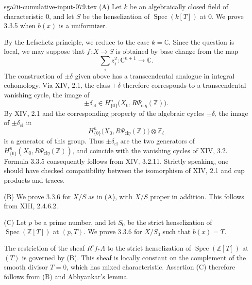 \begin{filecontents*}{sga7ii-cumulative-input-079.tex}
\medskip
\noindent\textup{(A)}
Let $k$ be an algebraically closed field of characteristic $0$, and
let $S$ be the henselization of $\operatorname{Spec}(k[T])$ at $0$.
We prove 3.3.5 when $b(x)$ is a uniformizer.

By the Lefschetz principle, we reduce to the case $k=\mathbb C$.
Since the question is local, we may suppose that $f:X\to S$ is
obtained by base change from the map
\[
\sum_i z_i^2:\mathbb C^{n+1}\longrightarrow\mathbb C.
\]
The construction of $\pm\delta$ given above has a transcendental
analogue in integral cohomology.  Via XIV, 2.1, the class
$\pm\delta$ therefore corresponds to a transcendental vanishing
cycle, the image of
\[
\pm\delta_{\mathrm{cl}}
\in H^n_{\{0\}}\bigl(X_0,R\Psi_{\mathrm{cl}\eta}(\mathbb Z)\bigr).
\]
By XIV, 2.1 and the corresponding property of the algebraic cycles
$\pm\delta$, the image of $\pm\delta_{\mathrm{cl}}$ in
\[
H^n_{\{0\}}\bigl(X_0,R\Psi_{\mathrm{cl}\eta}(\mathbb Z)\bigr)
\otimes\mathbb Z_\ell
\]
is a generator of this group.  Thus $\pm\delta_{\mathrm{cl}}$ are the
two generators of
$H^n_{\{0\}}(X_0,R\Psi_{\mathrm{cl}\eta}(\mathbb Z))$, and coincide
with the vanishing cycles of XIV, 3.2.  Formula 3.3.5 consequently
follows from XIV, 3.2.11.  Strictly speaking, one should have checked
compatibility between the isomorphism of XIV, 2.1 and cup products
and traces.

\medskip
\noindent\textup{(B)}
We prove 3.3.6 for $X/S$ as in (A), with $X/S$ proper in addition.
This follows from XIII, 2.4.6.2.

\medskip
\noindent\textup{(C)}
Let $p$ be a prime number, and let $S_0$ be the strict henselization
of $\operatorname{Spec}(\mathbb Z[T])$ at $(p,T)$.  We prove 3.3.6
for $X/S_0$ such that $b(x)=T$.

The restriction of the sheaf $R^if_*\Lambda$ to the strict
henselization of $\operatorname{Spec}(\mathbb Z[T])$ at $(T)$ is
governed by (B).  This sheaf is
locally constant on the complement of the smooth divisor $T=0$,
which has mixed characteristic.  Assertion (C) therefore follows
from (B) and Abhyankar's lemma.
\end{filecontents*}
